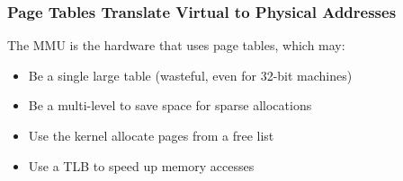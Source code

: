   \begin{frame}
    \frametitle{Page Tables Translate Virtual to Physical Addresses}

    The MMU is the hardware that uses page tables, which may:
    \begin{itemize}
      \item Be a single large table (wasteful, even for 32-bit machines)
      \item Be a multi-level to save space for sparse allocations
      \item Use the kernel allocate pages from a free list
      \item Use a TLB to speed up memory accesses
    \end{itemize}
  \end{frame}

